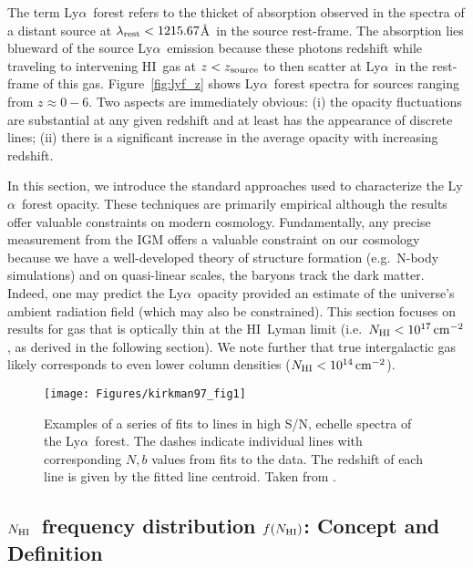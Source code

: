 \documentclass[graybox]{svmult}
\newcommand{\HI}{H{\sc I}}
\def\lya{Ly$\alpha$}
\newcommand{\mnhi}{N_{\rm HI}}
\newcommand{\nhi}{$\mnhi$}
\def\cm#1{\, {\rm cm^{#1}}}
\def\mfnhi{f(\mnhi)}
\def\fnhi{$\mfnhi$}
\begin{document}
The term \lya\ forest refers to the thicket of absorption
observed in the spectra of a distant source at 
$\lambda_{\rm rest} < 1215.67$\AA\ in the source rest-frame.
The absorption lies blueward of the source \lya\ emission
because these photons redshift while traveling to 
intervening \HI\ gas at $z < z_{\rm source}$ to then
scatter at \lya\ in the rest-frame of this gas.
Figure~\ref{fig:lyf_z} shows \lya\ forest spectra for
sources ranging from $z \approx 0-6$.  Two aspects are
immediately obvious: 
(i) the opacity fluctuations are substantial at any given
redshift and at least has the appearance of discrete lines;
(ii) there is a significant increase in the average opacity
with increasing redshift.  

In this section, we introduce
the standard approaches used to characterize the \lya\ 
forest opacity.  These techniques are primarily empirical
although the results offer valuable constraints on modern
cosmology.
Fundamentally, any precise measurement from the IGM offers a 
 valuable constraint on our cosmology
because we have a well-developed theory of structure formation (e.g.\ N-body
simulations) and
on quasi-linear scales, the baryons track the dark matter.
Indeed,
one may predict the \lya\ opacity provided an estimate
of the universe's ambient
radiation field (which may also be constrained).
This section focuses on results for gas that is
optically thin at the \HI\ Lyman limit (i.e.\ $\mnhi<10^{17} \cm{-2}$,
as derived in the following section).  We note further
that true intergalactic gas 
likely corresponds to even lower column densities
($\mnhi <10^{14} \cm{-2}$).

%
\begin{figure}[b]
\sidecaption
\texttt{[image: Figures/kirkman97\_fig1]}
%
%
\caption{Examples of a series of fits to lines in
high S/N, echelle spectra of the \lya\ forest.
The dashes indicate individual lines with corresponding
$N,b$ values from fits to the data.  The redshift of
each line is given by the fitted line centroid.
Taken from \cite{kt97}.
}
\label{fig:kirkman97_fig1}       %
\end{figure}
        
\subsection{\nhi\ frequency distribution \fnhi: Concept and Definition}
\end{document}
